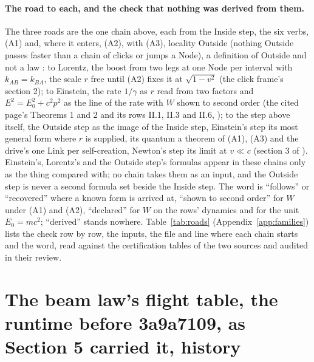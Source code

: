 \paragraph{The road to each, and the check that nothing was derived from them.} The three roads are the one chain above, each from the Inside step, the six verbs, (A1) and, where it enters, (A2), with (A3), locality Outside (nothing Outside passes faster than a chain of clicks or jumps a Node), a definition of Outside and not a law \cite{einsteinoutside}: to Lorentz, the boost from two legs at one Node per interval with $k_{AB} = k_{BA}$, the scale $r$ free until (A2) fixes it at $\sqrt{1 - v^2}$ (the click frame's section 2); to Einstein, the rate $1/\gamma$ as $r$ read from two factors and $E^2 = E_0^2 + c^2p^2$ as the line of the rate with $W$ shown to second order (the cited page's Theorems 1 and 2 and its rows II.1, II.3 and II.6, \cite{einsteinoutside}); to the step above itself, the Outside step as the image of the Inside step, Einstein's step its most general form where $r$ is supplied, its quantum a theorem of (A1), (A3) and the drive's one Link per self-creation, Newton's step its limit at $v \ll c$ (section 3 of \cite{einsteinoutside}). Einstein's, Lorentz's and the Outside step's formulas appear in these chains only as the thing compared with; no chain takes them as an input, and the Outside step is never a second formula set beside the Inside step. The word is ``follows'' or ``recovered'' where a known form is arrived at, ``shown to second order'' for $W$ under (A1) and (A2), ``declared'' for $W$ on the rows' dynamics and for the unit $E_0 = mc^2$; ``derived'' stands nowhere. Table~\ref{tab:roads} (Appendix~\ref{app:families}) lists the check row by row, the inputs, the file and line where each chain starts and the word, read against the certification tables of the two sources and audited in their review.



\section{The beam law's flight table, the runtime before 3a9a7109, as Section 5 carried it, history}\label{rec:flighthistory}

